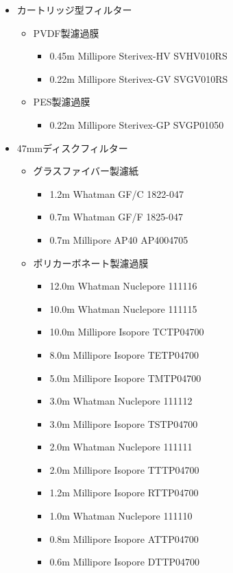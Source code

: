 \documentclass[titlepage,10pt,a4paper]{jsbook}
\begin{document}
\begin{itemize}
\item カートリッジ型フィルター
\begin{itemize}
\item PVDF製濾過膜
\begin{itemize}
\item 0.45{\textmu}m Millipore Sterivex-HV SVHV010RS
\item 0.22{\textmu}m Millipore Sterivex-GV SVGV010RS
\end{itemize}
\item PES製濾過膜
\begin{itemize}
\item 0.22{\textmu}m Millipore Sterivex-GP SVGP01050
\end{itemize}
\end{itemize}
\item 47mmディスクフィルター
\begin{itemize}
\item グラスファイバー製濾紙
\begin{itemize}
\item 1.2{\textmu}m Whatman GF/C 1822-047
\item 0.7{\textmu}m Whatman GF/F 1825-047
\item 0.7{\textmu}m Millipore AP40 AP4004705
\end{itemize}
\item ポリカーボネート製濾過膜
\begin{itemize}
\item 12.0{\textmu}m Whatman Nuclepore 111116
\item 10.0{\textmu}m Whatman Nuclepore 111115
\item 10.0{\textmu}m Millipore Isopore TCTP04700
\item 8.0{\textmu}m Millipore Isopore TETP04700
\item 5.0{\textmu}m Millipore Isopore TMTP04700
\item 3.0{\textmu}m Whatman Nuclepore 111112
\item 3.0{\textmu}m Millipore Isopore TSTP04700
\item 2.0{\textmu}m Whatman Nuclepore 111111
\item 2.0{\textmu}m Millipore Isopore TTTP04700
\item 1.2{\textmu}m Millipore Isopore RTTP04700
\item 1.0{\textmu}m Whatman Nuclepore 111110
\item 0.8{\textmu}m Millipore Isopore ATTP04700
\item 0.6{\textmu}m Millipore Isopore DTTP04700

\end{itemize}
\end{itemize}
\end{itemize}
\end{document}
